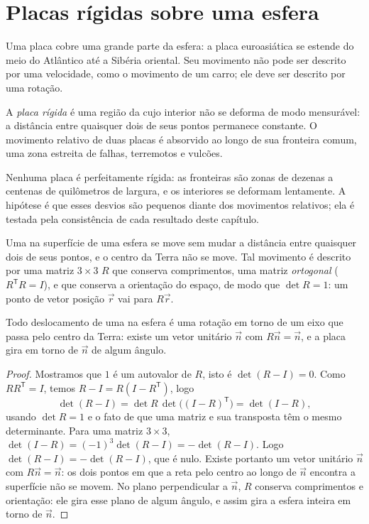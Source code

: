 \section{Placas rígidas sobre uma esfera}

Uma placa cobre uma grande parte da esfera: a placa euroasiática se estende do meio do Atlântico até a Sibéria oriental. Seu movimento não pode ser descrito por uma velocidade, como o movimento de um carro; ele deve ser descrito por uma rotação.

\begin{definition}\label{def:b1:plate-kinematics:rigid-plate}
A \emph{placa rígida} é uma região da  cujo
interior não se deforma de modo mensurável: a distância entre quaisquer dois de seus pontos
permanece constante. O movimento relativo de duas placas é absorvido ao longo de sua
fronteira comum, uma zona estreita de falhas, terremotos e vulcões.
\end{definition}

Nenhuma placa é perfeitamente rígida: as fronteiras são zonas de dezenas a centenas de quilômetros de largura, e os interiores se deformam lentamente. A hipótese é que esses desvios são pequenos diante dos movimentos relativos; ela é testada pela consistência de cada resultado deste capítulo.

Uma  na superfície de uma esfera se move sem mudar a distância entre quaisquer dois de seus pontos, e o centro da Terra não se move. Tal movimento é descrito
por uma matriz $3\times3$ $R$ que conserva comprimentos, uma matriz \emph{ortogonal} ($R^{\mathsf T}R = I$), e que conserva a orientação do espaço, de modo que $\det R = 1$:
um ponto de vetor posição $\vec r$ vai para $R\vec r$.

\begin{theorem}\label{thm:b1:plate-kinematics:euler}
Todo deslocamento de uma  na esfera é uma rotação em torno de um eixo
que passa pelo centro da Terra: existe um vetor unitário $\vec n$ com
$R\vec n = \vec n$, e a placa gira em torno de $\vec n$ de algum ângulo.
\end{theorem}

\begin{proof}
Mostramos que $1$ é um autovalor de $R$, isto é $\det(R - I) = 0$. Como
$R R^{\mathsf T} = I$, temos $R - I = R(I - R^{\mathsf T})$, logo
\[
  \det(R - I) = \det R\,\det\bigl((I - R)^{\mathsf T}\bigr) = \det(I - R),
\]
usando $\det R = 1$ e o fato de que uma matriz e sua transposta têm o mesmo
determinante. Para uma matriz $3\times3$,
$\det(I - R) = (-1)^3\det(R - I) = -\det(R - I)$. Logo $\det(R - I) =
-\det(R - I)$, que é nulo. Existe portanto um vetor unitário $\vec n$ com $R\vec n = \vec n$:
os dois pontos em que a reta pelo centro ao longo de $\vec n$ encontra a superfície
não se movem. No plano perpendicular a $\vec n$, $R$ conserva comprimentos e orientação:
ele gira esse plano de algum ângulo, e assim gira a esfera inteira em torno de $\vec n$.
\end{proof}

